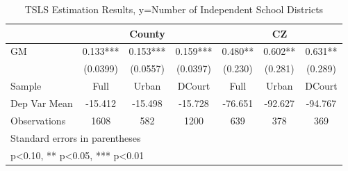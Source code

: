 \begin{table}[htbp]\centering
\def\sym#1{\ifmmode^{#1}\else\(^{#1}\)\fi}
\caption{TSLS Estimation Results, y=Number of Independent School Districts}
\begin{tabular}{l*{6}{c}}
\toprule
                &\multicolumn{3}{c}{County}            &\multicolumn{3}{c}{CZ}                \\\cmidrule(lr){2-4}\cmidrule(lr){5-7}
\midrule
GM              &    0.133***&    0.153***&    0.159***&    0.480** &    0.602** &    0.631** \\
                & (0.0399)   & (0.0557)   & (0.0397)   &  (0.230)   &  (0.281)   &  (0.289)   \\
\midrule
Sample          &     Full   &    Urban   &   DCourt   &     Full   &    Urban   &   DCourt   \\
Dep Var Mean    &  -15.412   &  -15.498   &  -15.728   &  -76.651   &  -92.627   &  -94.767   \\
Observations    &     1608   &      582   &     1200   &      639   &      378   &      369   \\
\bottomrule
\multicolumn{7}{l}{\footnotesize Standard errors in parentheses}\\
\multicolumn{7}{l}{\footnotesize * p<0.10, ** p<0.05, *** p<0.01}\\
\end{tabular}
\end{table}
